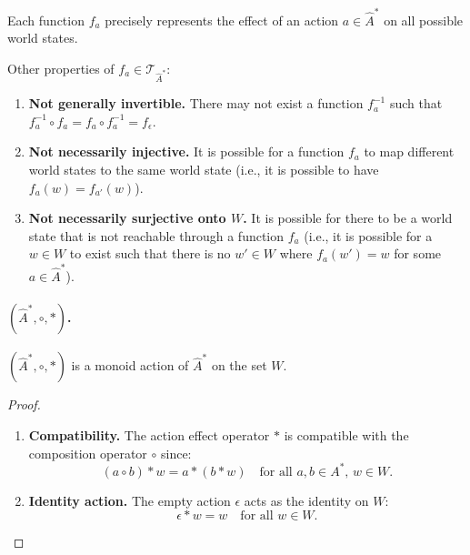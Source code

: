 
Each function $f_{a}$ precisely represents the effect of an action $a \in \hat{A}^{*}$ on all possible world states.

Other properties of $f_{a} \in \mathcal{T}_{\hat{A}^{\ast}}$:
\begin{enumerate}[(1)]
	\item \textbf{Not generally invertible.}
	      There may not exist a function $f_{a}^{-1}$ such that $f_{a}^{-1} \circ f_{a} = f_{a} \circ f_{a}^{-1} = f_{\epsilon}$.
	\item \textbf{Not necessarily injective.}
	      It is possible for a function $f_{a}$ to map different world states to the same world state (i.e., it is possible to have $f_{a}(w) = f_{a'}(w)$).
	\item \textbf{Not necessarily surjective onto $W$.}
	      It is possible for there to be a world state that is not reachable through a function $f_{a}$ (i.e., it is possible for a $w \in W$ to exist such that there is no $w' \in W$ where $f_{a}(w') = w$ for some $a \in \hat{A}^{\ast}$).
\end{enumerate}


\paragraph{$(\hat{A}^{\ast}, \circ, \ast)$.}
\begin{proposition}
	$(\hat{A}^{\ast}, \circ, \ast)$ is a monoid action of $\hat{A}^{\ast}$ on the set $W$.
\end{proposition}
\begin{proof}
	\begin{enumerate}[(1)]
		\item \textbf{Compatibility.}
		      The action effect operator $\ast$ is compatible with the composition operator $\circ$ since:
		      \begin{equation}
			      (a \circ b) \ast w = a \ast (b \ast w) \quad \text{for all } a, b \in A^{\ast}, \, w \in W.
		      \end{equation}

		\item \textbf{Identity action.}
		      The empty action $\epsilon$ acts as the identity on $W$:
		      \begin{equation}
			      \epsilon \ast w = w \quad \text{for all } w \in W.
		      \end{equation}

	\end{enumerate}
\end{proof}

